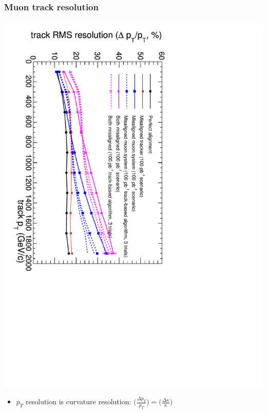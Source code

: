 \documentclass[compress]{beamer}
\begin{document}
\begin{frame}
\frametitle{Muon track resolution}

\includegraphics[height=\linewidth, angle=90]{ZSSM_Align_TrackRes_color-100.pdf}

\begin{itemize}
\item $p_T$ resolution is curvature resolution: $\displaystyle \bigg(\frac{\Delta {p_T}}{p_T}\bigg) = \bigg(\frac{\Delta \kappa}{\kappa}\bigg)$
\end{itemize}
\end{frame}
\end{document}
